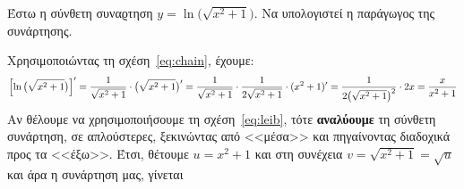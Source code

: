   \begin{exercise}
    Έστω η σύνθετη συναϱτηση $ y= \ln{\bigl(\sqrt{x^{2}+1}\bigr)} $. 
    Να υπολογιστεί η παράγωγος της συνάρτησης.  
  \end{exercise}
  \begin{solution}
    Χρησιμοποιώντας τη σχέση~\eqref{eq:chain}, έχουμε:
    \[
      \Bigl[\ln{\bigl(\sqrt{x^{2}+1}\bigr)} \Bigr]' = \frac{1}{\sqrt{x^{2}+1}} \cdot 
      \bigl(\sqrt{x^{2}+1} \bigr)' = \frac{1}{\sqrt{x^{2}+1}} \cdot 
      \frac{1}{2 \sqrt{x^{2}+1}} \cdot (x^{2}+1)' = \frac{1}{2 
      \bigl(\sqrt{x^{2}+1}\bigr)^{2}} \cdot 2x = \frac{x}{x^{2}+1}
    \]  
    Αν θέλουμε να χρησιμοποιήσουμε τη σχέση~\eqref{eq:leib}, τότε \textbf{αναλύουμε} 
    τη σύνθετη συνάρτηση, σε απλούστερες, ξεκινώντας από <<μέσα>> και πηγαίνοντας 
    διαδοχικά προς τα <<έξω>>. Έτσι, θέτουμε $ u=x^{2}+1 $ και στη συνέχεια
    $v= \sqrt{x^{2}+1} = \sqrt{u} $ και άρα η συνάρτηση μας, γίνεται

  \end{solution}
